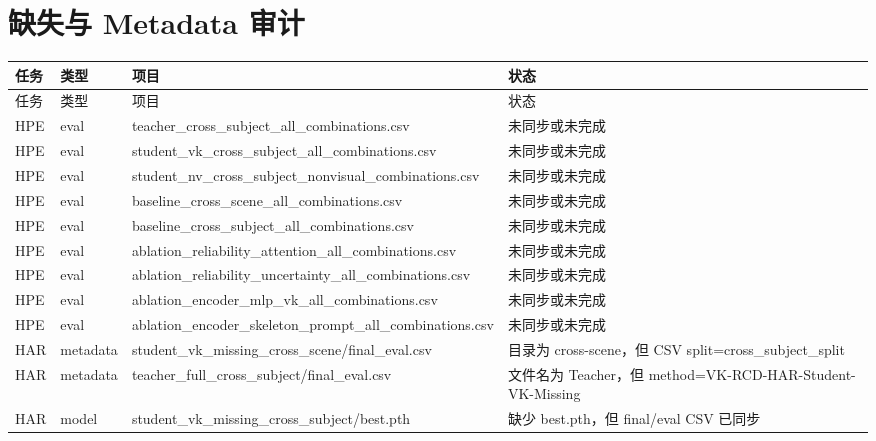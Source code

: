 \documentclass[UTF8,10pt]{ctexart}
\begin{document}
\section{缺失与 Metadata 审计}
{\scriptsize
\begin{longtable}{llll}
\toprule
任务 & 类型 & 项目 & 状态\\
\midrule
\endfirsthead
\toprule
任务 & 类型 & 项目 & 状态\\
\midrule
\endhead
HPE & eval & teacher\_cross\_subject\_all\_combinations.csv & 未同步或未完成\\
HPE & eval & student\_vk\_cross\_subject\_all\_combinations.csv & 未同步或未完成\\
HPE & eval & student\_nv\_cross\_subject\_nonvisual\_combinations.csv & 未同步或未完成\\
HPE & eval & baseline\_cross\_scene\_all\_combinations.csv & 未同步或未完成\\
HPE & eval & baseline\_cross\_subject\_all\_combinations.csv & 未同步或未完成\\
HPE & eval & ablation\_reliability\_attention\_all\_combinations.csv & 未同步或未完成\\
HPE & eval & ablation\_reliability\_uncertainty\_all\_combinations.csv & 未同步或未完成\\
HPE & eval & ablation\_encoder\_mlp\_vk\_all\_combinations.csv & 未同步或未完成\\
HPE & eval & ablation\_encoder\_skeleton\_prompt\_all\_combinations.csv & 未同步或未完成\\
HAR & metadata & student\_vk\_missing\_cross\_scene/final\_eval.csv & 目录为 cross-scene，但 CSV split=cross\_subject\_split\\
HAR & metadata & teacher\_full\_cross\_subject/final\_eval.csv & 文件名为 Teacher，但 method=VK-RCD-HAR-Student-VK-Missing\\
HAR & model & student\_vk\_missing\_cross\_subject/best.pth & 缺少 best.pth，但 final/eval CSV 已同步\\
\bottomrule
\end{longtable}
}
\end{document}
